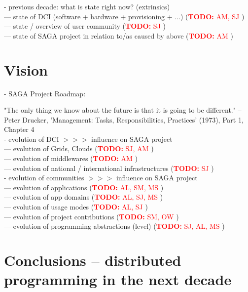 \documentclass{article}
\newcommand{\B}[1]{\textbf{#1}}
\newcommand{\nind}{\noindent}
\newcommand{\todo}[1]{{\textcolor{red}{\B{TODO:} #1 }}}
\begin{document}
 \nind
 - previous decade: what is state right now? (extrinsics)\\
 --- state of DCI (software + hardware + provisioning + ...) (\todo{AM, SJ})\\
 --- state / overview of user community (\todo{SJ})\\
 --- state of SAGA project in relation to/as caused by above (\todo{AM})


\section{Vision}

 \nind
 - SAGA Project Roadmap:\\

 
 \nind

 "The only thing we know about the future is that it is going to be
 different." -- Peter Drucker, 'Management: Tasks,
 Responsibilities, Practices' (1973), Part 1, Chapter 4\\ 


 - evolution of DCI $>>>$ influence on SAGA project\\
 --- evolution of Grids, Clouds (\todo{SJ, AM})\\
 --- evolution of middlewares (\todo{AM})\\
 --- evolution of national / international infrastructures (\todo{SJ})\\
 
 \nind
 - evolution of communities  $>>>$ influence on SAGA project\\
 --- evolution of applications (\todo{AL, SM, MS})\\
 --- evolution of app domains (\todo{AL, SJ, MS})\\
 --- evolution of usage modes (\todo{AL, SJ})\\
 --- evolution of project contributions (\todo{SM, OW})\\
 --- evolution of programming abstractions (level) (\todo{SJ, AL, MS})\\


\section{Conclusions -- distributed programming in the next decade}

\footnotesize


\end{document}
